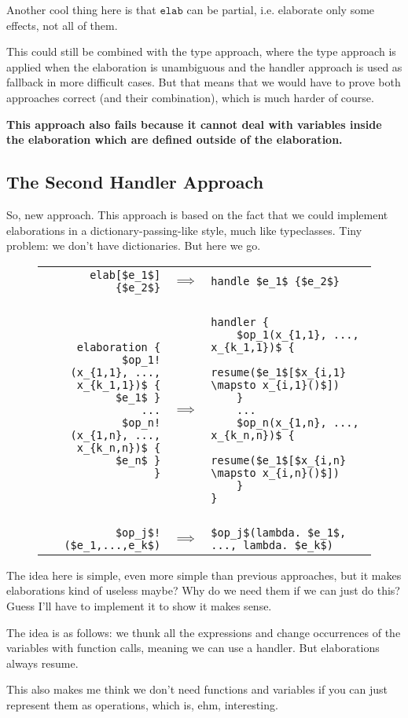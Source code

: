\documentclass{article}
\newcommand\kw[1]{\ensuremath{\mathbf{\mathtt{#1}}}}
\newcommand\elab{\kw{elab}}
\begin{document}
Another cool thing here is that $\elab$ can be partial, i.e. elaborate only some effects, not all of them.

This could still be combined with the type approach, where the type approach is applied when the elaboration is unambiguous and the handler approach is used as fallback in more difficult cases. But that means that we would have to prove both approaches correct (and their combination), which is much harder of course.

\textbf{This approach also fails because it cannot deal with variables inside the elaboration which are defined outside of the elaboration.}

\subsection{The Second Handler Approach}

So, new approach. This approach is based on the fact that we could implement elaborations in a dictionary-passing-like style, much like typeclasses. Tiny problem: we don't have dictionaries. But here we go.

\begin{figure}[h]
\begin{tabular}{rcl}
\lstinline|elab[$e_1$] {$e_2$}|
& $\implies$
& \lstinline|handle $e_1$ {$e_2$}|
\\\\
\begin{lstlisting}
elaboration {
    $op_1!(x_{1,1}, ..., x_{k_1,1})$ { $e_1$ }
    ...
    $op_n!(x_{1,n}, ..., x_{k_n,n})$ { $e_n$ }
}
\end{lstlisting}
&$\implies$
&\begin{lstlisting}
handler {
    $op_1(x_{1,1}, ..., x_{k_1,1})$ {
        resume($e_1$[$x_{i,1} \mapsto x_{i,1}()$])
    }
    ...
    $op_n(x_{1,n}, ..., x_{k_n,n})$ {
        resume($e_1$[$x_{i,n} \mapsto x_{i,n}()$])
    }
}
\end{lstlisting}
\\\\
\lstinline|$op_j$!($e_1,...,e_k$)|
& $\implies$
& \lstinline|$op_j$(lambda. $e_1$, ..., lambda. $e_k$)|
\end{tabular}
\end{figure}

The idea here is simple, even more simple than previous approaches, but it makes elaborations kind of useless maybe? Why do we need them if we can just do this? Guess I'll have to implement it to show it makes sense.

The idea is as follows: we thunk all the expressions and change occurrences of the variables with function calls, meaning we can use a handler. But elaborations always resume.

This also makes me think we don't need functions and variables if you can just represent them as operations, which is, ehm, interesting.
\end{document}
